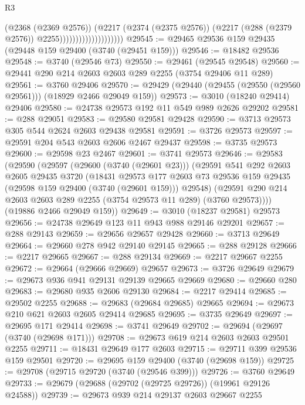 \begin{lexlean}{R3}
\begin{coremodule}
                                        (@2368 (@2369 @2576))
                                        (@2217
                                          (@2374 (@2375 @2576))
                                          (@2217 (@288 (@2379 @2576)) @2255))))))))))))))))))))
@29545 := @29465 @29536 @159 @29435 (@29448 @159 @29400 (@3740 (@29451 @159)))
@29546 := @18482 @29536
@29548 := @3740 (@29546 @73)
@29550 := @29461 (@29545 @29548)
@29560 := @29441 @290 @214 @2603 @2603 @289 @2255 (@3754 @29406 @11 @289)
@29561 := @3760 @29406
@29570 := @29429 (@29440 (@29455 (@29550 (@29560 @29561))) (@18929 @2466 @29049 @159))
@29573 := @3010 (@18240 @29414) @29406
@29580 := @24738 @29573 @192 @11 @549 @989 @2626 @29202
@29581 := @288 @29051
@29583 := @29580 @29581 @29428
@29590 := @3713 @29573 @305 @544 @2624 @2603 @29438 @29581
@29591 := @3726 @29573
@29597 := @29591 @204 @543 @2603 @2606 @2467 @29437
@29598 := @3735 @29573
@29600 := @29598 @23 @2467
@29601 := @3741 @29573
@29646 := @29583
    (@29590
      (@29597
        (@29600 (@3740 (@29601 @23)))
        (@29591
          @541
          @292
          @2603
          @2605
          @29435
          @3720
          (@18431
            @29573
            @177
            @2603
            @73
            @29536
            @159
            @29435
            (@29598 @159 @29400 (@3740 (@29601 @159)))
            @29548)
          (@29591 @290 @214 @2603 @2603 @289 @2255 (@3754 @29573 @11 @289) (@3760 @29573))))
      (@19886 @2466 @29049 @159))
@29649 := @3010 (@18237 @29581) @29573
@29656 := @24738 @29649 @123 @11 @943 @988 @29146 @29201
@29657 := @288 @29143
@29659 := @29656 @29657 @29428
@29660 := @3713 @29649
@29664 := @29660 @278 @942 @29140 @29145
@29665 := @288 @29128
@29666 := @2217 @29665
@29667 := @288 @29134
@29669 := @2217 @29667 @2255
@29672 := @29664 (@29666 @29669) @29657
@29673 := @3726 @29649
@29679 := @29673 @936 @941 @29131 @29139 @29665 @29669
@29680 := @29660 @280
@29683 := @29680 @935 @2606 @29130
@29684 := @2217 @29414
@29685 := @29502 @2255
@29688 := @29683 (@29684 @29685) @29665
@29694 := @29673 @210 @621 @2603 @2605 @29414 @29685
@29695 := @3735 @29649
@29697 := @29695 @171 @29414
@29698 := @3741 @29649
@29702 := @29694 (@29697 (@3740 (@29698 @171)))
@29708 := @29673 @619 @214 @2603 @2603 @29501 @2255
@29711 := @18431 @29649 @177 @2603
@29715 := @29711 @399 @29536 @159 @29501
@29720 := @29695 @159 @29400 (@3740 (@29698 @159))
@29725 := @29708 (@29715 @29720 (@3740 (@29546 @399)))
@29726 := @3760 @29649
@29733 := @29679 (@29688 (@29702 (@29725 @29726)) (@19961 @29126 @24588))
@29739 := @29673 @939 @214 @29137 @2603 @29667 @2255

\end{coremodule}
\end{lexlean}
